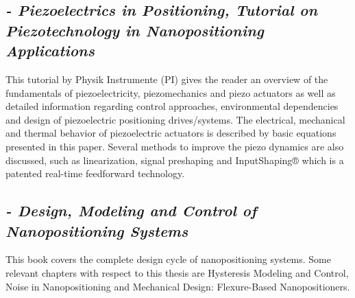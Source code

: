 \subsection*{\citep*{Piezo:2008} {\small \emph{- Piezoelectrics in Positioning, Tutorial on Piezotechnology in Nanopositioning Applications}} }
This tutorial by Physik Instrumente (PI) gives the reader an overview of the fundamentals of piezoelectricity, piezomechanics and piezo actuators as well as detailed information regarding control approaches, environmental dependencies and design of piezoelectric positioning drives/systems. The electrical, mechanical and thermal behavior of piezoelectric actuators is described by basic equations presented in this paper. Several methods to improve the piezo dynamics are also discussed, such as linearization, signal preshaping and InputShaping® which is a patented real-time feedforward technology.

\subsection*{\citep*{FlemingLeang:2014} {\small \emph{- Design, Modeling and Control of Nanopositioning Systems}} }
This book covers the complete design cycle of nanopositioning systems. Some relevant chapters with respect to this thesis are Hysteresis Modeling and Control, Noise in Nanopositioning and Mechanical Design: Flexure-Based Nanopositioners.
